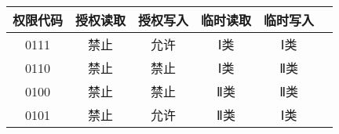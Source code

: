 \documentclass[UTF8]{ctexart}
\begin{document}
    \begin{center}
    \begin{tabular}{cccccc}
        \hline
        权限代码& 授权读取& 授权写入& 临时读取& 临时写入\\
        \hline
        0111& 禁止& 允许& Ⅰ类& Ⅰ类\\
        0110& 禁止& 禁止& Ⅰ类& Ⅱ类\\
        0100& 禁止& 禁止& Ⅱ类& Ⅱ类\\
        0101& 禁止& 允许& Ⅱ类& Ⅰ类\\
        \hline
    \end{tabular}
    \end{center}
\end{document}
